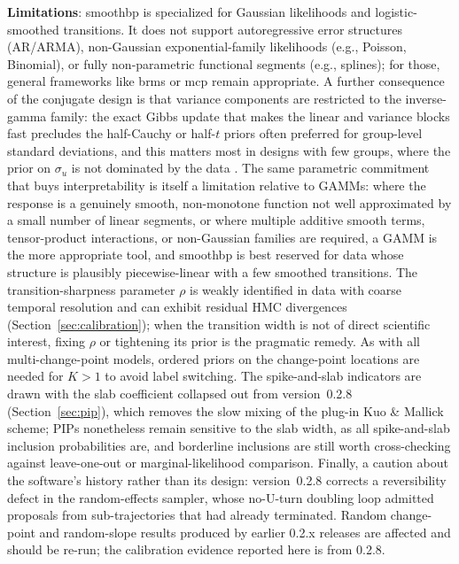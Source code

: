\documentclass[12pt]{article}
\newcommand{\pkg}[1]{\textsf{#1}}
\begin{document}
\textbf{Limitations}: \pkg{smoothbp} is specialized for Gaussian likelihoods and logistic-smoothed transitions. It does not support autoregressive error structures (AR/ARMA), non-Gaussian exponential-family likelihoods (e.g., Poisson, Binomial), or fully non-parametric functional segments (e.g., splines); for those, general frameworks like \pkg{brms} or \pkg{mcp} remain appropriate. A further consequence of the conjugate design is that variance components are restricted to the inverse-gamma family: the exact Gibbs update that makes the linear and variance blocks fast precludes the half-Cauchy or half-$t$ priors often preferred for group-level standard deviations, and this matters most in designs with few groups, where the prior on $\sigma_u$ is not dominated by the data \citep{gelman2006}. The same parametric commitment that buys interpretability is itself a limitation relative to GAMMs: where the response is a genuinely smooth, non-monotone function not well approximated by a small number of linear segments, or where multiple additive smooth terms, tensor-product interactions, or non-Gaussian families are required, a GAMM is the more appropriate tool, and \pkg{smoothbp} is best reserved for data whose structure is plausibly piecewise-linear with a few smoothed transitions. The transition-sharpness parameter $\rho$ is weakly identified in data with coarse temporal resolution and can exhibit residual HMC divergences (Section~\ref{sec:calibration}); when the transition width is not of direct scientific interest, fixing $\rho$ or tightening its prior is the pragmatic remedy. As with all multi-change-point models, ordered priors on the change-point locations are needed for $K > 1$ to avoid label switching. The spike-and-slab indicators are drawn with the slab coefficient collapsed out from version~0.2.8 (Section~\ref{sec:pip}), which removes the slow mixing of the plug-in Kuo \& Mallick scheme; PIPs nonetheless remain sensitive to the slab width, as all spike-and-slab inclusion probabilities are, and borderline inclusions are still worth cross-checking against leave-one-out or marginal-likelihood comparison. Finally, a caution about the software's history rather than its design: version~0.2.8 corrects a reversibility defect in the random-effects sampler, whose no-U-turn doubling loop admitted proposals from sub-trajectories that had already terminated. Random change-point and random-slope results produced by earlier 0.2.x releases are affected and should be re-run; the calibration evidence reported here is from 0.2.8.
\end{document}
